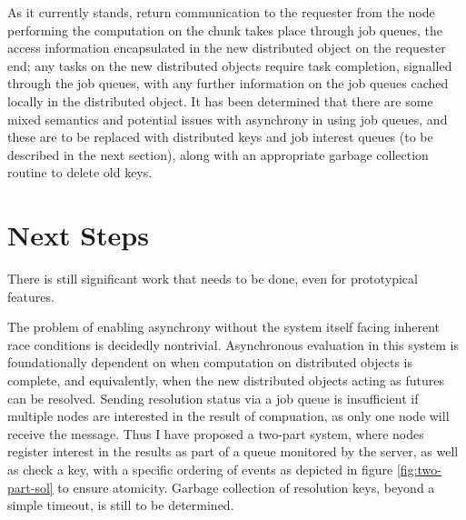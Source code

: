 \documentclass[a4paper,10pt]{article}
\begin{document}
As it currently stands, return communication to the requester from the node
performing the computation on the chunk takes place through job queues, the
access information encapsulated in the new distributed object on the requester
end; any tasks on the new distributed objects require task completion,
signalled through the job queues, with any further information on the job
queues cached locally in the distributed object.
It has been determined that there are some mixed semantics and potential issues
with asynchrony in using job queues, and these are to be replaced with
distributed keys and job interest queues (to be described in the next section),
along with an appropriate garbage collection routine to delete old keys.

\section{Next Steps}

There is still significant work that needs to be done, even for prototypical features.

The problem of enabling asynchrony without the system itself facing inherent
race conditions is decidedly nontrivial.
Asynchronous evaluation in this system is foundationally dependent on when
computation on distributed objects is complete, and equivalently, when the new
distributed objects acting as futures can be resolved.
Sending resolution status via a job queue is insufficient if multiple nodes are
interested in the result of compuation, as only one node will receive the
message.
Thus I have proposed a two-part system, where nodes register interest in the
results as part of a queue monitored by the server, as well as check a key,
with a specific ordering of events as depicted in figure \ref{fig:two-part-sol}
to ensure atomicity. 
Garbage collection of resolution keys, beyond a simple timeout, is still to be
determined.
\end{document}
